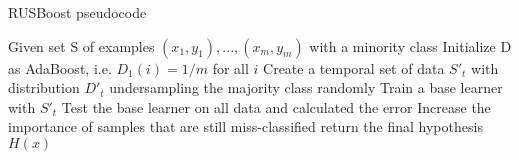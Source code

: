 \begin{algorithm}                      %
\caption{RUSBoost pseudocode}          %
\label{alg:rb}                           %
\begin{algorithmic}                    %
	\STATE Given set S of examples $(x_{1},y_{1}),...,(x_{m},y_{m})$ with a minority class
	\STATE Initialize D as  AdaBoost, i.e. $D_{1}(i)=1/m$ for all $i$
            \STATE Create a temporal set of data $S'_{t}$ with distribution $D'_{t}$ undersampling the majority class randomly
            \STATE Train a base learner with $S'_{t}$
            \STATE Test the base learner on all data and calculated the error
            \STATE Increase the importance of samples that are still miss-classified
    \ENDFOR
    \STATE return the final hypothesis $H(x)$
\end{algorithmic}
\end{algorithm}